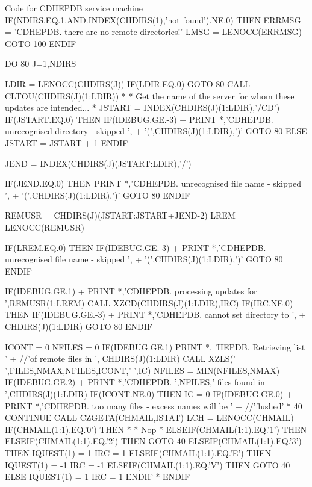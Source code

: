 \begin{XMPt}{Code for CDHEPDB service machine}
      IF(NDIRS.EQ.1.AND.INDEX(CHDIRS(1),'not found').NE.0) THEN
         ERRMSG = 'CDHEPDB. there are no remote directories!'
         LMSG   = LENOCC(ERRMSG)
         GOTO 100
      ENDIF
 
      DO 80 J=1,NDIRS
 
         LDIR = LENOCC(CHDIRS(J))
         IF(LDIR.EQ.0) GOTO 80
         CALL CLTOU(CHDIRS(J)(1:LDIR))
*
*     Get the name of the server for whom these updates are intended...
*
         JSTART = INDEX(CHDIRS(J)(1:LDIR),'/CD')
         IF(JSTART.EQ.0) THEN
            IF(IDEBUG.GE.-3)
     +      PRINT *,'CDHEPDB. unrecognised directory - skipped ',
     +      '(',CHDIRS(J)(1:LDIR),')'
            GOTO 80
         ELSE
            JSTART = JSTART + 1
         ENDIF
 
         JEND = INDEX(CHDIRS(J)(JSTART:LDIR),'/')
 
         IF(JEND.EQ.0) THEN
            PRINT *,'CDHEPDB. unrecognised file name - skipped ',
     +      '(',CHDIRS(J)(1:LDIR),')'
            GOTO 80
         ENDIF
 
         REMUSR = CHDIRS(J)(JSTART:JSTART+JEND-2)
         LREM = LENOCC(REMUSR)
 
         IF(LREM.EQ.0) THEN
            IF(IDEBUG.GE.-3)
     +      PRINT *,'CDHEPDB. unrecognised file name - skipped ',
     +      '(',CHDIRS(J)(1:LDIR),')'
            GOTO 80
         ENDIF
 
         IF(IDEBUG.GE.1)
     +   PRINT *,'CDHEPDB. processing updates for ',REMUSR(1:LREM)
         CALL XZCD(CHDIRS(J)(1:LDIR),IRC)
         IF(IRC.NE.0) THEN
            IF(IDEBUG.GE.-3)
     +      PRINT *,'CDHEPDB. cannot set directory to ',
     +         CHDIRS(J)(1:LDIR)
            GOTO 80
         ENDIF
 
         ICONT  = 0
         NFILES = 0
         IF(IDEBUG.GE.1) PRINT *, 'HEPDB. Retrieving list '
     +   //'of remote files in ', CHDIRS(J)(1:LDIR)
         CALL XZLS(' ',FILES,NMAX,NFILES,ICONT,' ',IC)
         NFILES = MIN(NFILES,NMAX)
         IF(IDEBUG.GE.2)
     +   PRINT *,'CDHEPDB. ',NFILES,' files found in ',CHDIRS(J)(1:LDIR)
         IF(ICONT.NE.0) THEN
            IC = 0
            IF(IDEBUG.GE.0)
     +      PRINT *,'CDHEPDB. too many files - excess names will be '
     +      //'flushed'
*
   40       CONTINUE
            CALL CZGETA(CHMAIL,ISTAT)
            LCH = LENOCC(CHMAIL)
            IF(CHMAIL(1:1).EQ.'0') THEN
*
*        Nop
*
            ELSEIF(CHMAIL(1:1).EQ.'1') THEN
            ELSEIF(CHMAIL(1:1).EQ.'2') THEN
               GOTO 40
            ELSEIF(CHMAIL(1:1).EQ.'3') THEN
               IQUEST(1) = 1
               IRC = 1
            ELSEIF(CHMAIL(1:1).EQ.'E') THEN
               IQUEST(1) = -1
               IRC = -1
            ELSEIF(CHMAIL(1:1).EQ.'V') THEN
               GOTO 40
            ELSE
               IQUEST(1) = 1
               IRC = 1
            ENDIF
*
         ENDIF
 

\end{XMPt}
